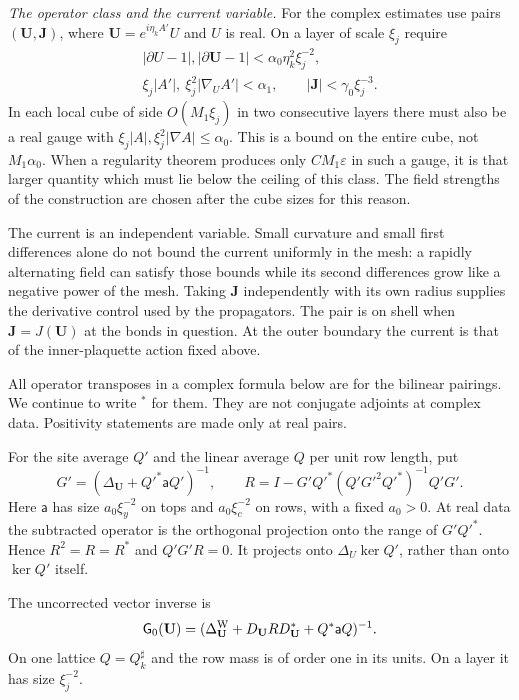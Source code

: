 \documentclass[11pt,letterpaper,reqno]{amsart}
\theoremstyle{definition}
\theoremstyle{remark}
\begin{document}
\emph{The operator class and the current variable.}
For the complex estimates use pairs $(\mathbf U,\mathbf J)$,
where $\mathbf U=e^{i\eta_kA'}U$ and $U$ is real. On a layer
of scale $\xi_j$ require
\[
 \begin{gathered}
 |\partial U-1|,|\partial\mathbf U-1|
                          <\alpha_0\eta_k^2\xi_j^{-2},\\
 \xi_j|A'|,\ \xi_j^2|\nabla_UA'|<\alpha_1,
 \qquad |\mathbf J|<\gamma_0\xi_j^{-3}.
 \end{gathered}
\]
In each local cube of side $O(M_1\xi_j)$ in two consecutive
layers there must also be a real gauge with
$\xi_j|A|,\xi_j^2|\nabla A|\le\alpha_0$. This is a bound on
the entire cube, not $M_1\alpha_0$. When a regularity theorem
produces only $CM_1\varepsilon$ in such a gauge, it is that
larger quantity which must lie below the ceiling of this class.
The field strengths of the construction are chosen after the
cube sizes for this reason.

The current is an independent variable. Small curvature and
small first differences alone do not bound the current uniformly
in the mesh: a rapidly alternating field can satisfy those
bounds while its second differences grow like a negative power
of the mesh. Taking $\mathbf J$ independently with its own
radius supplies the derivative control used by the propagators.
The pair is on shell when $\mathbf J=J(\mathbf U)$ at the
bonds in question. At the outer boundary the current is that of
the inner-plaquette action fixed above.

All operator transposes in a complex formula below are for the
bilinear pairings. We continue to write ${}^*$ for them. They
are not conjugate adjoints at complex data. Positivity statements
are made only at real pairs.

For the site average $Q'$ and the linear average $Q$ per unit
row length, put
\begin{equation}\label{eq:mrg-landau-projection}
 G'=(\Delta_{\mathbf U}+Q'^*\mathsf a Q')^{-1},\qquad
 R=I-G'Q'^*(Q'G'^2Q'^*)^{-1}Q'G'.
\end{equation}
Here $\mathsf a$ has size $a_0\xi_y^{-2}$ on tops and
$a_0\xi_c^{-2}$ on rows, with a fixed $a_0>0$. At real data
the subtracted operator is the orthogonal projection onto the
range of $G'Q'^*$. Hence $R^2=R=R^*$ and $Q'G'R=0$.
It projects onto $\Delta_U\ker Q'$, rather than onto
$\ker Q'$ itself.

The uncorrected vector inverse is
\begin{equation}\label{eq:rg-green}
 \mathsf G_0(\mathbf U)=
  (\Delta_{\mathbf U}^{\rm W}+D_{\mathbf U}RD_{\mathbf U}^*
                              +Q^*\mathsf a Q)^{-1}.
\end{equation}
On one lattice $Q=Q_k^\sharp$ and the row mass is of order
one in its units. On a layer it has size $\xi_j^{-2}$.
\end{document}
